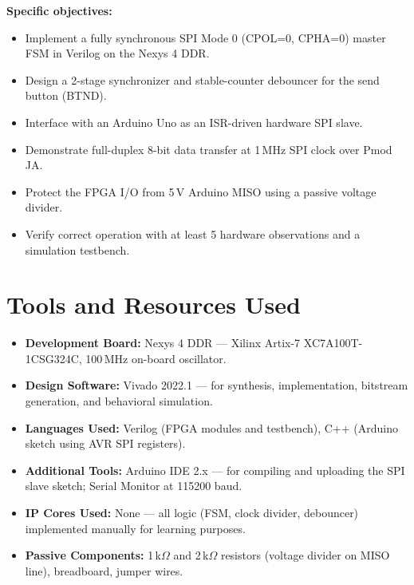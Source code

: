 \documentclass[12pt,a4paper]{report}
\begin{document}
\textbf{Specific objectives:}
\begin{itemize}[leftmargin=1.5em]
  \item Implement a fully synchronous SPI Mode 0 (CPOL=0, CPHA=0) master FSM in Verilog on the Nexys 4 DDR.
  \item Design a 2-stage synchronizer and stable-counter debouncer for the send button (BTND).
  \item Interface with an Arduino Uno as an ISR-driven hardware SPI slave.
  \item Demonstrate full-duplex 8-bit data transfer at 1\,MHz SPI clock over Pmod JA.
  \item Protect the FPGA I/O from 5\,V Arduino MISO using a passive voltage divider.
  \item Verify correct operation with at least 5 hardware observations and a simulation testbench.
\end{itemize}

\chapter{Tools and Resources Used}

\begin{itemize}[leftmargin=1.5em]
  \item \textbf{Development Board:} Nexys 4 DDR --- Xilinx Artix-7 XC7A100T-1CSG324C, 100\,MHz on-board oscillator.
  \item \textbf{Design Software:} Vivado 2022.1 --- for synthesis, implementation, bitstream generation, and behavioral simulation.
  \item \textbf{Languages Used:} Verilog (FPGA modules and testbench), C++ (Arduino sketch using AVR SPI registers).
  \item \textbf{Additional Tools:} Arduino IDE 2.x --- for compiling and uploading the SPI slave sketch; Serial Monitor at 115200 baud.
  \item \textbf{IP Cores Used:} None --- all logic (FSM, clock divider, debouncer) implemented manually for learning purposes.
  \item \textbf{Passive Components:} 1\,k$\Omega$ and 2\,k$\Omega$ resistors (voltage divider on MISO line), breadboard, jumper wires.
\end{itemize}

\end{document}
